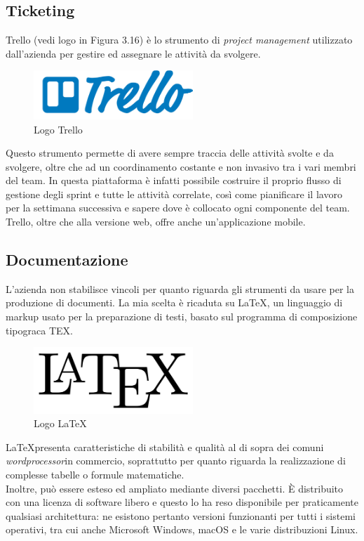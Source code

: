 \subsection{Ticketing}
Trello (vedi logo in Figura 3.16) è lo strumento di \textit{project management} utilizzato dall'azienda per gestire ed assegnare le attività da svolgere.
\begin{figure}[!h] 
    \centering 
    \includegraphics[width=6cm]{immagini/loghi/trello.png}
    \caption{Logo Trello}
\end{figure}
Questo strumento permette di avere sempre traccia delle attività svolte e da svolgere, oltre che ad un coordinamento costante e non invasivo tra i vari membri del team. In questa piattaforma è infatti possibile costruire il proprio flusso di gestione degli sprint e tutte le attività correlate, così come pianificare il lavoro per la settimana successiva e sapere dove è collocato ogni componente del team. Trello, oltre che alla versione web, offre anche un'applicazione mobile.

\subsection{Documentazione}
L'azienda non stabilisce vincoli per quanto riguarda gli strumenti da usare per la produzione di documenti. La mia scelta è ricaduta su \LaTeX, un linguaggio di markup usato per la preparazione di testi, basato sul programma di composizione tipograca TEX.
\begin{figure}[!h] 
    \centering 
    \includegraphics[width=6cm]{immagini/loghi/latex.png}
    \caption{Logo \LaTeX}
\end{figure}
\LaTeX presenta caratteristiche di stabilità e qualità al di sopra dei comuni \emph{wordprocessor}\glsfirstoccur in commercio, soprattutto per quanto riguarda la realizzazione di complesse tabelle o formule matematiche. 
\\
Inoltre, può essere esteso ed ampliato mediante diversi pacchetti. È distribuito con una licenza di software libero e questo lo ha reso disponibile per praticamente qualsiasi architettura: ne esistono pertanto versioni funzionanti per tutti i sistemi operativi, tra cui anche Microsoft Windows, macOS e le varie distribuzioni Linux.

